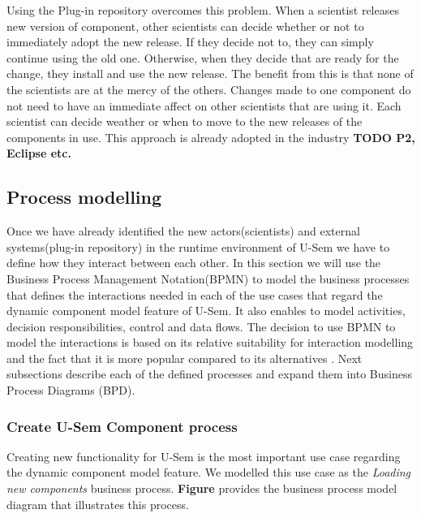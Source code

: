 Using the Plug-in repository overcomes this problem. When a scientist releases new version of component, other scientists can decide whether or not to immediately adopt the new release. If they decide not to, they can simply continue using the old one. Otherwise, when they decide that are ready for the change, they install and use the new release. The benefit from this is that none of the scientists are at the mercy of the others. Changes made to one component do not need to have an immediate affect on other scientists that are using it. Each scientist can decide weather or when to move to the new releases of the components in use. This approach is already adopted in the industry \textbf{TODO P2, Eclipse etc.}


\subsection{Process modelling}

Once we have already identified the new actors(scientists) and external systems(plug-in repository) in the runtime environment of U-Sem we have to define how they interact between each other. In this section we will use the Business Process Management Notation(BPMN) \cite{BPMN} to model the business processes that defines the interactions needed in each of the use cases that regard the dynamic component model feature of U-Sem. It also enables to model activities, decision responsibilities, control and data flows. The decision to use BPMN to model the interactions is based on its relative suitability for interaction modelling and the fact that it is more popular compared to its alternatives \cite{Decker}. Next subsections describe each of the defined processes and expand them into Business Process Diagrams (BPD).

\subsubsection{Create U-Sem Component process}

Creating new functionality for U-Sem is the most important use case regarding the dynamic component model feature. We modelled this use case as the \textit{Loading new components} business process. \textbf{Figure} provides the business process model diagram that illustrates this process. 

